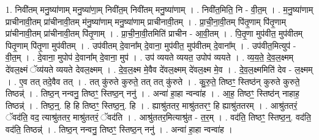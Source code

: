 \documentclass[17pt]{extarticle}
\begin{document}
1. निवी॑तम् मनु॒ष्या॑णाम् मनु॒ष्या॑णा॒म् निवी॑त॒म् निवी॑तम् मनु॒ष्या॑णाम् । . निवी॑त॒मिति॒ नि - वी॒त॒म् । . म॒नु॒ष्या॑णाम् प्राचीनावी॒तम् प्रा॑चीनावी॒तम् म॑नु॒ष्या॑णाम् मनु॒ष्या॑णाम् प्राचीनावी॒तम् । . प्रा॒ची॒ना॒वी॒तम् पि॑तृ॒णाम् पि॑तृ॒णाम् प्रा॑चीनावी॒तम् प्रा॑चीनावी॒तम् पि॑तृ॒णाम् । . प्रा॒ची॒ना॒वी॒तमिति॑ प्राचीन - आ॒वी॒तम् । . पि॒तृ॒णा मुप॑वीत॒ मुप॑वीतम् पितृ॒णाम् पि॑तृ॒णा मुप॑वीतम् । . उप॑वीतम् दे॒वाना᳚म् दे॒वाना॒ मुप॑वीत॒ मुप॑वीतम् दे॒वाना᳚म् । . उप॑वीत॒मित्युप॑ - वी॒त॒म् । . दे॒वाना॒ मुपोप॑ दे॒वाना᳚म् दे॒वाना॒ मुप॑ । . उप॑ व्ययते व्ययत॒ उपोप॑ व्ययते । . व्य॒य॒ते॒ दे॒व॒ल॒क्ष्मम् दे॑वल॒क्ष्मं ॅव्य॑यते व्ययते देवल॒क्ष्मम् । . दे॒व॒ल॒क्ष्म मे॒वैव दे॑वल॒क्ष्मम् दे॑वल॒क्ष्म मे॒व । . दे॒व॒ल॒क्ष्ममिति॑ देव - ल॒क्ष्मम् । . ए॒व तत् तदे॒वैव तत् । . तत् कु॑रुते कुरुते॒ तत् तत् कु॑रुते । . कु॒रु॒ते॒ तिष्ठꣳ॒॒ स्तिष्ठ॑न् कुरुते कुरुते॒ तिष्ठन्न्॑ । . तिष्ठ॒न् नन्वनु॒ तिष्ठꣳ॒॒ स्तिष्ठ॒न् ननु॑ । . अन्वा॑ हा॒हा न्वन्वा॑ह । . आ॒ह॒ तिष्ठꣳ॒॒ स्तिष्ठ॑न् नाहाह॒ तिष्ठन्न्॑ । . तिष्ठ॒न्॒. हि हि तिष्ठꣳ॒॒ स्तिष्ठ॒न्॒. हि । . ह्याश्रु॑ततर॒ माश्रु॑ततरꣳ॒॒ हि ह्याश्रु॑ततरम् । . आश्रु॑ततरं॒ ॅवद॑ति॒ वद॒ त्याश्रु॑ततर॒ माश्रु॑ततरं॒ ॅवद॑ति । . आश्रु॑ततर॒मित्याश्रु॑त - त॒र॒म् । . वद॑ति॒ तिष्ठꣳ॒॒ स्तिष्ठ॒न्॒. वद॑ति॒ वद॑ति॒ तिष्ठन्न्॑ । . तिष्ठ॒न् नन्वनु॒ तिष्ठꣳ॒॒ स्तिष्ठ॒न् ननु॑ । . अन्वा॑ हा॒हा न्वन्वा॑ह । \newline
\end{document}
